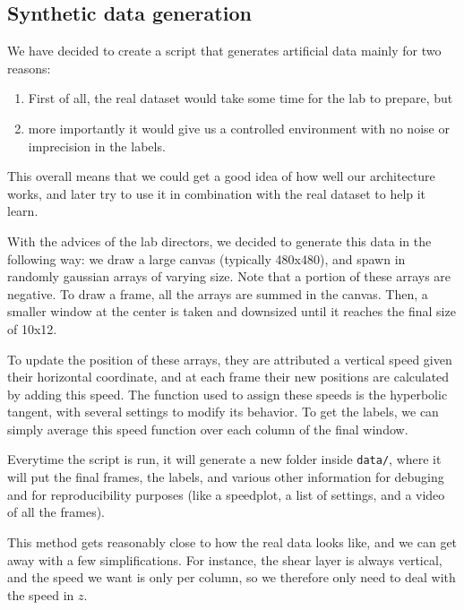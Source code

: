 \documentclass[10pt,conference]{IEEEtran}
\begin{document}
\subsection{Synthetic data generation}
We have decided to create a script that generates artificial data mainly for two reasons: 
\begin{enumerate}
  \item First of all, the real dataset would take some time for the lab to prepare, but
  \item more importantly it would give us a controlled environment with no noise or imprecision in the labels.
\end{enumerate}
This overall means that we could get a good idea of how well our architecture works, and later try to use it in combination with the real dataset to help it learn.\par
With the advices of the lab directors, we decided to generate this data in the following way: we draw a large canvas (typically 480x480), and spawn in randomly gaussian arrays of varying size. Note that a portion of these arrays are negative. To draw a frame, all the arrays are summed in the canvas. Then, a smaller window at the center is taken and downsized until it reaches the final size of 10x12.\par
To update the position of these arrays, they are attributed a vertical speed given their horizontal coordinate, and at each frame their new positions are calculated by adding this speed. The function used to assign these speeds is the hyperbolic tangent, with several settings to modify its behavior. To get the labels, we can simply average this speed function over each column of the final window.\par
Everytime the script is run, it will generate a new folder inside \texttt{data/}, where it will put the final frames, the labels, and various other information for debuging and for reproducibility purposes (like a speedplot, a list of settings, and a video of all the frames).

This method gets reasonably close to how the real data looks like, and we can get away with a few simplifications. For instance, the shear layer is always vertical, and the speed we want is only per column, so we therefore only need to deal with the speed in $z$.
\end{document}
